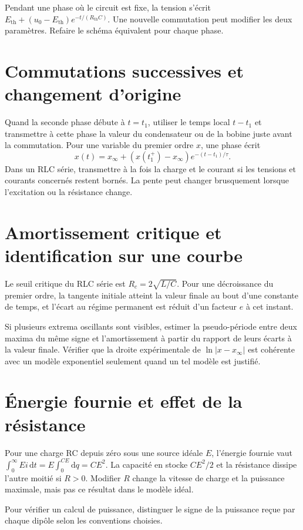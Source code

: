 \documentclass[11pt,a4paper]{article}
\begin{document}
Pendant une phase où le circuit est fixe, la tension s’écrit $E_{\mathrm{th}}+(u_0-E_{\mathrm{th}})e^{-t/(R_{\mathrm{th}}C)}$. Une nouvelle commutation peut modifier les deux paramètres. Refaire le schéma équivalent pour chaque phase.

\section*{Commutations successives et changement d’origine}
Quand la seconde phase débute à $t=t_1$, utiliser le temps local $t-t_1$ et transmettre à cette phase la valeur du condensateur ou de la bobine juste avant la commutation. Pour une variable du premier ordre $x$, une phase écrit
\[ x(t)=x_\infty+(x(t_1^+)-x_\infty)e^{-(t-t_1)/\tau}. \]
Dans un RLC série, transmettre à la fois la charge et le courant si les tensions et courants concernés restent bornés. La pente peut changer brusquement lorsque l’excitation ou la résistance change.

\section*{Amortissement critique et identification sur une courbe}
Le seuil critique du RLC série est $R_c=2\sqrt{L/C}$. Pour une décroissance du premier ordre, la tangente initiale atteint la valeur finale au bout d’une constante de temps, et l’écart au régime permanent est réduit d’un facteur $e$ à cet instant.

Si plusieurs extrema oscillants sont visibles, estimer la pseudo-période entre deux maxima du même signe et l’amortissement à partir du rapport de leurs écarts à la valeur finale. Vérifier que la droite expérimentale de $\ln|x-x_\infty|$ est cohérente avec un modèle exponentiel seulement quand un tel modèle est justifié.

\section*{Énergie fournie et effet de la résistance}
Pour une charge RC depuis zéro sous une source idéale $E$, l’énergie fournie vaut $\int_0^\infty Ei\,\mathrm dt=E\int_0^{CE}\mathrm dq=CE^2$. La capacité en stocke $CE^2/2$ et la résistance dissipe l’autre moitié si $R>0$. Modifier $R$ change la vitesse de charge et la puissance maximale, mais pas ce résultat dans le modèle idéal.

Pour vérifier un calcul de puissance, distinguer le signe de la puissance reçue par chaque dipôle selon les conventions choisies.
\end{document}
